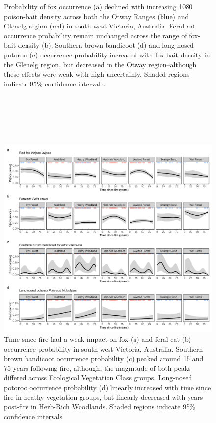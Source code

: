 \documentclass[11pt,a4paper,titlepage,twoside,openright]{style/unimelbthesis}
\begin{document}
\begin{mainmatter}
\begin{figure}
{}

\caption{Probability of fox occurrence (a) declined with increasing 1080 poison-bait density across both the Otway Ranges (blue) and Glenelg region (red) in south-west Victoria, Australia. Feral cat occurrence probability remain unchanged across the range of fox-bait density (b). Southern brown bandicoot (d) and long-nosed potoroo (e) occurrence probability increased with fox-bait density in the Glenelg region, but decreased in the Otway region--although these effects were weak with high uncertainty. Shaded regions indicate 95\% confidence intervals.}\label{fig:occ-1080}
\end{figure}
\newpage

\(~\)

\(~\)

\(~\)
\begin{figure}

{\centering \includegraphics[width=1\linewidth]{figure/tsf} 

}

\caption{Time since fire had a weak impact on fox (a) and feral cat (b) occurrence probability in south-west Victoria, Australia. Southern brown bandicoot occurrence probability (c) peaked around 15 and 75 years following fire, although, the magnitude of both peaks differed across Ecological Vegetation Class groups. Long-nosed potoroo occurrence probability (d) linearly increased with time since fire in heathy vegetation groups, but linearly decreased with years post-fire in Herb-Rich Woodlands. Shaded regions indicate 95\% confidence intervals}\label{fig:occ-tsf}
\end{figure}
\newpage


\end{mainmatter}
\end{document}
